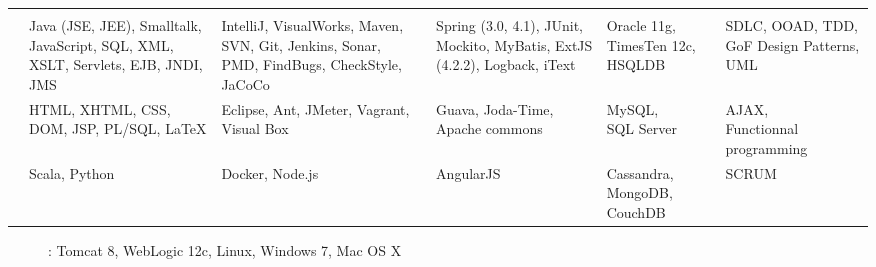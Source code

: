 \section*{}
\begin{tabular}{@{}L{0.8in}L{1.35in}L{1.35in}L{1.13in}L{0.85in}L{1.2in}@{}}
&
\textbf{} &
\textbf{} &
\textbf{} &
\textbf{} &
\textbf{} \\

\small{\textit{}} &
\small{Java (JSE, JEE), Smalltalk, JavaScript, SQL, XML, XSLT, Servlets, EJB, JNDI, JMS} &
\small{IntelliJ, VisualWorks, Maven, SVN, Git, Jenkins, Sonar, PMD, FindBugs, CheckStyle, JaCoCo} &
\small{Spring (3.0, 4.1), JUnit, Mockito, MyBatis, ExtJS (4.2.2), Logback, iText} &
\small{Oracle 11g, TimesTen 12c, HSQLDB} &
\small{SDLC, OOAD, TDD, GoF Design Patterns, UML} \\

\small{\textit{}} &
\small{HTML, XHTML, CSS, DOM, JSP, PL/SQL, \LaTeX} &
\small{Eclipse, Ant, JMeter, Vagrant, Visual Box} &
\small{Guava, Joda-Time, Apache commons} &
\small{MySQL, \newline SQL Server} &
\small{AJAX, \newline Functionnal programming} \\

\small{\textit{}} &
\small{Scala, Python} &
\small{Docker, Node.js} &
\small{AngularJS} &
\small{Cassandra, MongoDB, CouchDB} &
\small{SCRUM}
\end{tabular}
\vspace{2pt}
\begin{description}
\item[] : Tomcat 8, WebLogic 12c, Linux, Windows 7, Mac OS X
\end{description}
